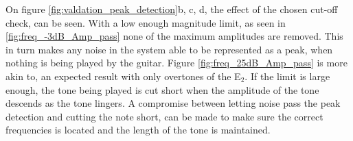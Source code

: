 On figure \ref{fig:valdation_peak_detection}b, c, d, the effect of the chosen cut-off check, can be seen.
With a low enough magnitude limit, as seen in \ref{fig:freq_-3dB_Amp_pass} none of the maximum amplitudes are removed.
This in turn makes any noise in the system able to be represented as a peak, when nothing is being played by the guitar.
Figure \ref{fig:freq_25dB_Amp_pass} is more akin to, an expected result with only overtones of the E$_2$.
If the limit is large enough, the tone being played is cut short when the amplitude of the tone descends as the tone lingers.
A compromise between letting noise pass the peak detection and cutting the note short, can be made to make sure the correct frequencies is located and the length of the tone is maintained.